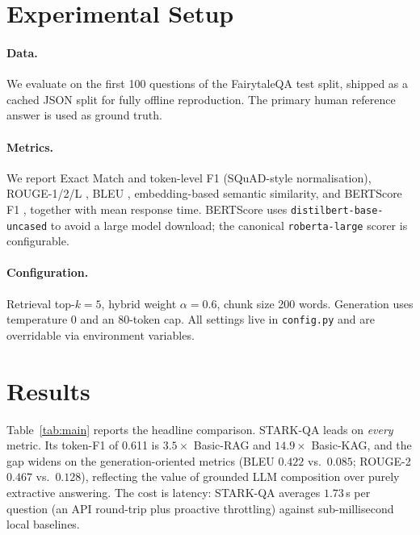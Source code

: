 \documentclass[11pt]{article}
\begin{document}
\section{Experimental Setup}
\label{sec:setup}
\paragraph{Data.} We evaluate on the first 100 questions of the FairytaleQA test
split, shipped as a cached JSON split for fully offline reproduction. The primary
human reference answer is used as ground truth.

\paragraph{Metrics.} We report Exact Match and token-level F1 (SQuAD-style
normalisation), ROUGE-1/2/L \citep{lin-2004-rouge}, BLEU
\citep{papineni-2002-bleu}, embedding-based semantic similarity, and BERTScore
F1 \citep{zhang2020bertscore}, together with mean response time. BERTScore uses
\texttt{distilbert-base-uncased} to avoid a large model download; the canonical
\texttt{roberta-large} scorer is configurable.

\paragraph{Configuration.} Retrieval top-$k=5$, hybrid weight $\alpha=0.6$, chunk
size 200 words. Generation uses temperature $0$ and an 80-token cap. All settings
live in \texttt{config.py} and are overridable via environment variables.

\section{Results}
\label{sec:results}
Table~\ref{tab:main} reports the headline comparison. STARK-QA leads on
\emph{every} metric. Its token-F1 of 0.611 is $3.5\times$ Basic-RAG and
$14.9\times$ Basic-KAG, and the gap widens on the generation-oriented metrics
(BLEU $0.422$ vs.\ $0.085$; ROUGE-2 $0.467$ vs.\ $0.128$), reflecting the value
of grounded LLM composition over purely extractive answering. The cost is
latency: STARK-QA averages $1.73$\,s per question (an API round-trip plus
proactive throttling) against sub-millisecond local baselines.
\end{document}
